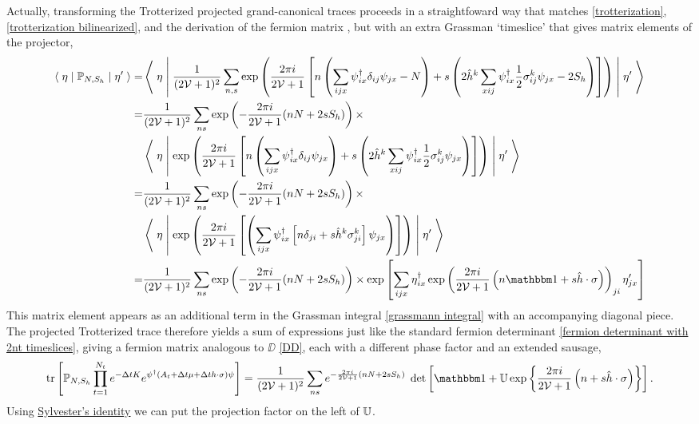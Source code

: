 Actually, transforming the Trotterized projected grand-canonical traces proceeds in a straightfoward way that matches \eqref{trotterization}, \eqref{trotterization bilinearized}, and the derivation of the fermion matrix , but with an extra Grassman `timeslice' that gives matrix elements of the projector,
\begin{align}
	\matrixElement{\eta}{ \PP_{N, S_h} }{\eta'}
	=&
	\matrixElement{\eta}{
		\oneover{(2\Volume+1)^2}\sum_{n,s} \exp\left(\frac{2\pi i}{2\Volume+1}\left[ n \left(\sum_{ijx}\psi\adjoint_{ix} \delta_{ij}\psi_{jx} -N\right) + s \left(2 \hat{h}^k \sum_{xij}\psi\adjoint_{ix} \half \sigma_{ij}^k \psi_{jx} - 2S_h\right)\right]\right)
	}{\eta'}
	\nonumber\\
	=&
	\oneover{(2\Volume+1)^2}\sum_{ns} \exp\left(-\frac{2\pi i}{2\Volume+1} (nN+2s S_h)\right)\times
	\nonumber\\
	&\matrixElement{\eta}{
		\exp\left(\frac{2\pi i}{2\Volume+1}\left[ n \left(\sum_{ijx}\psi\adjoint_{ix} \delta_{ij}\psi_{jx}\right) + s \left(2 \hat{h}^k \sum_{xij}\psi\adjoint_{ix} \half \sigma_{ij}^k \psi_{jx}\right)\right]\right)
	}{\eta'}
	\nonumber\\
	=&
	\oneover{(2\Volume+1)^2}\sum_{ns} \exp\left(-\frac{2\pi i}{2\Volume+1} (nN+2s S_h)\right)\times
	\nonumber\\
	&\matrixElement{\eta}{
		\exp\left(\frac{2\pi i}{2\Volume+1}\left[ \left(\sum_{ijx}\psi\adjoint_{ix}\left[n \delta_{ji} + s \hat{h}^k\sigma_{ji}^k\right]\psi_{jx}\right) \right]\right)
	}{\eta'}
	\nonumber\\
	=&
	\oneover{(2\Volume+1)^2}\sum_{ns} \exp\left(-\frac{2\pi i}{2\Volume+1} (nN+2s S_h)\right)\times
	\exp\left[
		\sum_{ijx}
		\eta\adjoint_{ix}
			\exp\left( \frac{2\pi i}{2\Volume+1} \left(n\one + s \hat{h}\cdot \sigma\right) \right)_{ji}
		\eta'_{jx}
	\right]
\end{align}
This matrix element appears as an additional term in the Grassman integral \eqref{grassmann integral} with an accompanying diagonal piece.
The projected Trotterized trace therefore yields a sum of expressions just like the standard fermion determinant \eqref{fermion determinant with 2nt timeslices}, giving a fermion matrix analogous to $\DD$ \eqref{DD}, each with a different phase factor and an extended sausage,
\begin{align}
	\tr{\PP_{N,S_h} \prod_{t=1}^{N_t} e^{-\Delta t K}e^{\psi\adjoint\left(A_t + \Delta t \mu + \Delta t h\cdot\sigma\right)\psi}}
	=
	\oneover{(2\Volume+1)^2} \sum_{ns} e^{-\frac{2\pi i}{2\Volume+1} (nN+2sS_h)}\; \det\left[ \one + \UU \exp\left\{ \frac{2\pi i}{2\Volume+1}\left(n + s \hat{h} \cdot \sigma\right)\right\}\right].
\end{align}
Using \href{https://en.wikipedia.org/wiki/Determinant#Sylvester's\_determinant\_theorem}{Sylvester's identity} we can put the projection factor on the left of $\mathbb{U}$.

